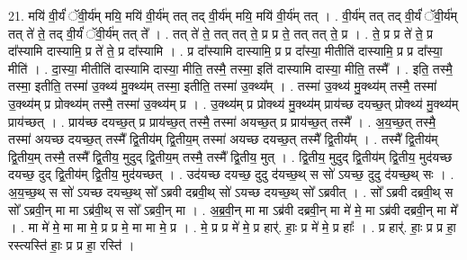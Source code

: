 \documentclass[17pt]{extarticle}
\begin{document}
21. मयि॑ वी॒र्यं॑ ॅवी॒र्य॑म् मयि॒ मयि॑ वी॒र्य॑म् तत् तद् वी॒र्य॑म् मयि॒ मयि॑ वी॒र्य॑म् तत् । . वी॒र्य॑म् तत् तद् वी॒र्यं॑ ॅवी॒र्य॑म् तत् ते॑ ते॒ तद् वी॒र्यं॑ ॅवी॒र्य॑म् तत् ते᳚ । . तत् ते॑ ते॒ तत् तत् ते॒ प्र प्र ते॒ तत् तत् ते॒ प्र । . ते॒ प्र प्र ते॑ ते॒ प्र दा᳚स्यामि दास्यामि॒ प्र ते॑ ते॒ प्र दा᳚स्यामि । . प्र दा᳚स्यामि दास्यामि॒ प्र प्र दा᳚स्या॒ मीतीति॑ दास्यामि॒ प्र प्र दा᳚स्या॒ मीति॑ । . दा॒स्या॒ मीतीति॑ दास्यामि दास्या॒ मीति॒ तस्मै॒ तस्मा॒ इति॑ दास्यामि दास्या॒ मीति॒ तस्मै᳚ । . इति॒ तस्मै॒ तस्मा॒ इतीति॒ तस्मा॑ उ॒क्थ्य॑ मु॒क्थ्य॑म् तस्मा॒ इतीति॒ तस्मा॑ उ॒क्थ्य᳚म् । . तस्मा॑ उ॒क्थ्य॑ मु॒क्थ्य॑म् तस्मै॒ तस्मा॑ उ॒क्थ्य॑म् प्र प्रोक्थ्य॑म् तस्मै॒ तस्मा॑ उ॒क्थ्य॑म् प्र । . उ॒क्थ्य॑म् प्र प्रोक्थ्य॑ मु॒क्थ्य॑म् प्राय॑च्छ दयच्छ॒त् प्रोक्थ्य॑ मु॒क्थ्य॑म् प्राय॑च्छत् । . प्राय॑च्छ दयच्छ॒त् प्र प्राय॑च्छ॒त् तस्मै॒ तस्मा॑ अयच्छ॒त् प्र प्राय॑च्छ॒त् तस्मै᳚ । . अ॒य॒च्छ॒त् तस्मै॒ तस्मा॑ अयच्छ दयच्छ॒त् तस्मै᳚ द्वि॒तीय॑म् द्वि॒तीय॒म् तस्मा॑ अयच्छ दयच्छ॒त् तस्मै᳚ द्वि॒तीय᳚म् । . तस्मै᳚ द्वि॒तीय॑म् द्वि॒तीय॒म् तस्मै॒ तस्मै᳚ द्वि॒तीय॒ मुदुद् द्वि॒तीय॒म् तस्मै॒ तस्मै᳚ द्वि॒तीय॒ मुत् । . द्वि॒तीय॒ मुदुद् द्वि॒तीय॑म् द्वि॒तीय॒ मुद॑यच्छ दयच्छ॒ दुद् द्वि॒तीय॑म् द्वि॒तीय॒ मुद॑यच्छत् । . उद॑यच्छ दयच्छ॒ दुदु द॑यच्छ॒थ् स सो॑ ऽयच्छ॒ दुदु द॑यच्छ॒थ् सः । . अ॒य॒च्छ॒थ् स सो॑ ऽयच्छ दयच्छ॒थ् सो᳚ ऽब्रवी दब्रवी॒थ् सो॑ ऽयच्छ दयच्छ॒थ् सो᳚ ऽब्रवीत् । . सो᳚ ऽब्रवी दब्रवी॒थ् स सो᳚ ऽब्रवी॒न् मा मा ऽब्र॑वी॒थ् स सो᳚ ऽब्रवी॒न् मा । . अ॒ब्र॒वी॒न् मा मा ऽब्र॑वी दब्रवी॒न् मा मे॑ मे॒ मा ऽब्र॑वी दब्रवी॒न् मा मे᳚ । . मा मे॑ मे॒ मा मा मे॒ प्र प्र मे॒ मा मा मे॒ प्र । . मे॒ प्र प्र मे॑ मे॒ प्र हार्॑. हाः॒ प्र मे॑ मे॒ प्र हाः᳚ । . प्र हार्॑. हाः॒ प्र प्र हा॒ रस्त्यस्ति॑ हाः॒ प्र प्र हा॒ रस्ति॑ । \newline
\end{document}

